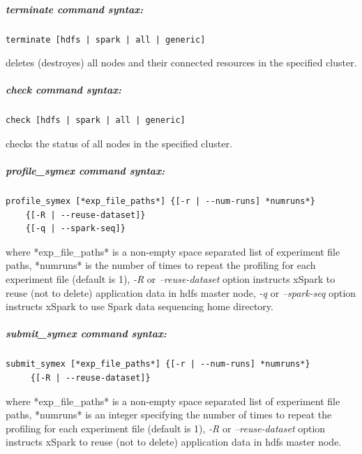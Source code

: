 \hypertarget{terminate-command-syntax}{%
\subparagraph{\texorpdfstring{\emph{terminate} command
		syntax:}{terminate command syntax:}}\label{terminate-command-syntax}}

\begin{verbatim}
terminate [hdfs | spark | all | generic]
\end{verbatim}

deletes (destroyes) all nodes and their connected resources in the
specified cluster.

\hypertarget{check-command-syntax}{%
\subparagraph{\texorpdfstring{\emph{check} command
		syntax:}{check command syntax:}}\label{check-command-syntax}}

\begin{verbatim}
check [hdfs | spark | all | generic]
\end{verbatim}

checks the status of all nodes in the specified cluster.

\hypertarget{profile-command-syntax}{%
\subparagraph{\texorpdfstring{\emph{profile\_symex} command
		syntax:}{profile command syntax:}}\label{profile-command-syntax}}

\begin{verbatim}
profile_symex [*exp_file_paths*] {[-r | --num-runs] *numruns*} 
    {[-R | --reuse-dataset]} 
    {[-q | --spark-seq]}      
\end{verbatim}

where *exp\_file\_paths* is a non-empty space separated list of
experiment file paths, *numruns* is the number of times to repeat the
profiling for each experiment file (default is 1), \emph{-R} or
\emph{--reuse-dataset} option instructs xSpark to reuse (not to delete)
application data in hdfs master node, \emph{-q} or \emph{--spark-seq}
option instructs xSpark to use Spark data sequencing home directory.

\hypertarget{submit-command-syntax}{%
\subparagraph{\texorpdfstring{\emph{submit\_symex} command
		syntax:}{submit command syntax:}}\label{submit-command-syntax}}

\begin{verbatim}
submit_symex [*exp_file_paths*] {[-r | --num-runs] *numruns*} 
     {[-R | --reuse-dataset]}      
\end{verbatim}

where *exp\_file\_paths* is a non-empty space separated list of
experiment file paths, *numruns* is an integer specifying the number of
times to repeat the profiling for each experiment file (default is 1),
\emph{-R} or \emph{--reuse-dataset} option instructs xSpark to reuse
(not to delete) application data in hdfs master node.

